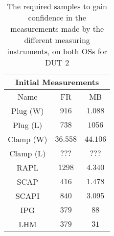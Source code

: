\begin{table}[H]
    \centering
    \begin{tabular}{|| c | c | c ||}
    \hline
    \multicolumn{3}{||c||}{Initial Measurements} \\ [0.5ex] \hline\hline
    Name & FR & MB \\\hline
    Plug (W) & $916$ & $1.088$ \\
    Plug (L) & $738$ & $1056$ \\
    Clamp (W) & $36.558$ & $44.106$ \\
    Clamp (L) & $???$ & $???$ \\
    RAPL & $1298$ & $4.340$ \\
    SCAP & $416$ & $1.478$ \\
    SCAPI & $840$ & $3.095$ \\
    IPG & $379$ & $88$ \\
    LHM & $379$ & $31$ \\\hline
    \end{tabular}
    \caption{The required samples to gain confidence in the measurements made by the different measuring instruments, on both OSs for DUT 2}
    \label{tab:initial-measurements-exp-2-dut-2}
\end{table}